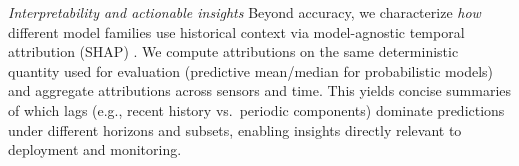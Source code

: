 \documentclass[10pt]{article}
\begin{document}
\textit{Interpretability and actionable insights}
\label{sec:insights}
Beyond accuracy, we characterize \emph{how} different model families use historical context via
model-agnostic temporal attribution (SHAP) \citep{lundberg2017shap}. We compute attributions on the same
deterministic quantity used for evaluation (predictive mean/median for probabilistic models) and
aggregate attributions across sensors and time. This yields concise summaries of which lags (e.g., recent
history vs.\ periodic components) dominate predictions under different horizons and subsets, enabling
insights directly relevant to deployment and monitoring.





\end{document}
